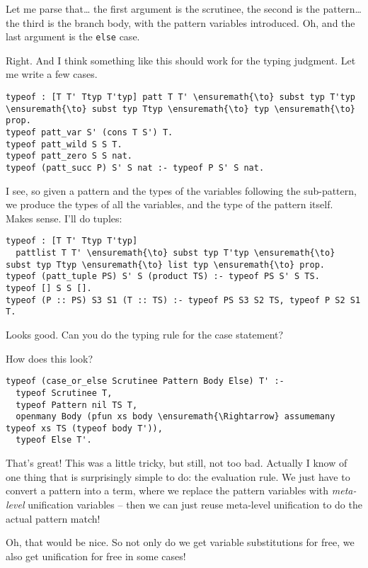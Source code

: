 \heroSTUDENT{} Let me parse that\ldots{} the first argument is the scrutinee,
the second is the pattern\ldots{} the third is the branch body, with the
pattern variables introduced. Oh, and the last argument is the
\texttt{else} case.

\heroADVISOR{} Right. And I think something like this should work for the
typing judgment. Let me write a few cases.

\begin{verbatim}
typeof : [T T' Ttyp T'typ] patt T T' \ensuremath{\to} subst typ T'typ \ensuremath{\to} subst typ Ttyp \ensuremath{\to} typ \ensuremath{\to} prop.
typeof patt_var S' (cons T S') T.
typeof patt_wild S S T.
typeof patt_zero S S nat.
typeof (patt_succ P) S' S nat :- typeof P S' S nat.
\end{verbatim}

\heroSTUDENT{} I see, so given a pattern and the types of the variables
following the sub-pattern, we produce the types of all the variables,
and the type of the pattern itself. Makes sense. I'll do tuples:

\begin{verbatim}
typeof : [T T' Ttyp T'typ]
  pattlist T T' \ensuremath{\to} subst typ T'typ \ensuremath{\to} subst typ Ttyp \ensuremath{\to} list typ \ensuremath{\to} prop.
typeof (patt_tuple PS) S' S (product TS) :- typeof PS S' S TS.
typeof [] S S [].
typeof (P :: PS) S3 S1 (T :: TS) :- typeof PS S3 S2 TS, typeof P S2 S1 T.
\end{verbatim}

\heroADVISOR{} Looks good. Can you do the typing rule for the case statement?

\heroSTUDENT{} How does this look?

\begin{verbatim}
typeof (case_or_else Scrutinee Pattern Body Else) T' :-
  typeof Scrutinee T,
  typeof Pattern nil TS T,
  openmany Body (pfun xs body \ensuremath{\Rightarrow} assumemany typeof xs TS (typeof body T')),
  typeof Else T'.
\end{verbatim}

\heroADVISOR{} That's great! This was a little tricky, but still, not too bad.
Actually I know of one thing that is surprisingly simple to do: the
evaluation rule. We just have to convert a pattern into a term, where we
replace the pattern variables with \emph{meta-level} unification
variables -- then we can just reuse meta-level unification to do the
actual pattern match!

\heroSTUDENT{} Oh, that would be nice. So not only do we get variable
substitutions for free, we also get unification for free in some cases!

